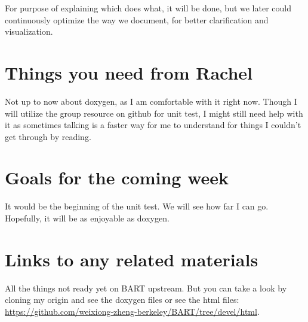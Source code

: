 \documentclass{article}
\begin{document}
For purpose of explaining which does what, it will be done, but we later could continuously optimize the
way we document, for better clarification and visualization.

\section{Things you need from Rachel}
Not up to now about doxygen, as I am comfortable with it right now. Though I will utilize 
the group resource on github for unit test, I might still need help with it as sometimes talking
is a faster way for me to understand for things I couldn't get through by reading.

\section{Goals for the coming week}
It would be the beginning of the unit test. We will see how far I can go. Hopefully, it
will be as enjoyable as doxygen.

\section{Links to any related materials}
All the things not ready yet on BART upstream. But you can take a look by cloning my origin and see the doxygen files or see the html files:  \url{https://github.com/weixiong-zheng-berkeley/BART/tree/devel/html}.



%
%
%

\end{document}

